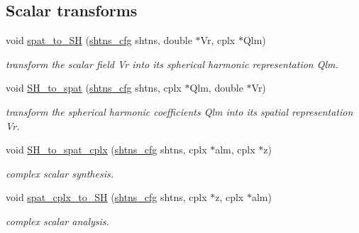 \subsection*{Scalar transforms}
\begin{DoxyCompactItemize}
\item 
void \hyperlink{group__sht_gab97ae9ef106cebf95d9a84a8f4482ffa}{spat\+\_\+to\+\_\+\+S\+H} (\hyperlink{shtns_8h_ab7bd78e5cbeb4ed18782d018195fde00}{shtns\+\_\+cfg} shtns, double $\ast$Vr, cplx $\ast$Qlm)
\begin{DoxyCompactList}\small\item\em transform the scalar field Vr into its spherical harmonic representation Qlm. \end{DoxyCompactList}\item 
void \hyperlink{group__sht_gac1a4d365d025cf96a47188d521f45238}{S\+H\+\_\+to\+\_\+spat} (\hyperlink{shtns_8h_ab7bd78e5cbeb4ed18782d018195fde00}{shtns\+\_\+cfg} shtns, cplx $\ast$Qlm, double $\ast$Vr)
\begin{DoxyCompactList}\small\item\em transform the spherical harmonic coefficients Qlm into its spatial representation Vr. \end{DoxyCompactList}\item 
void \hyperlink{group__sht_gace24abc96ffd0cf8dd5bc282854fa91f}{S\+H\+\_\+to\+\_\+spat\+\_\+cplx} (\hyperlink{shtns_8h_ab7bd78e5cbeb4ed18782d018195fde00}{shtns\+\_\+cfg} shtns, cplx $\ast$alm, cplx $\ast$z)
\begin{DoxyCompactList}\small\item\em complex scalar synthesis. \end{DoxyCompactList}\item 
void \hyperlink{group__sht_gacfe564c5f554c04834c2fd02a2cbd660}{spat\+\_\+cplx\+\_\+to\+\_\+\+S\+H} (\hyperlink{shtns_8h_ab7bd78e5cbeb4ed18782d018195fde00}{shtns\+\_\+cfg} shtns, cplx $\ast$z, cplx $\ast$alm)
\begin{DoxyCompactList}\small\item\em complex scalar analysis. \end{DoxyCompactList}\end{DoxyCompactItemize}
